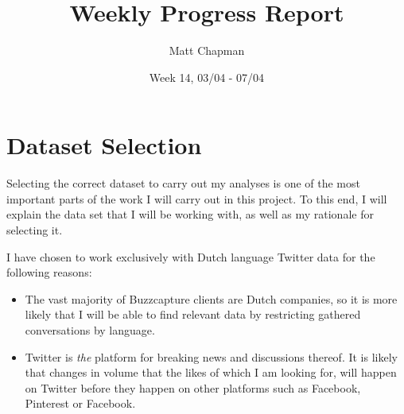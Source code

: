 \documentclass[a4paper]{scrartcl}
\title{Weekly Progress Report}
\date{Week 14, 03/04 - 07/04}
\author{Matt Chapman}
\begin{document}
\maketitle

\section{Dataset Selection}

Selecting the correct dataset to carry out my analyses is one of the most important parts of the work I will carry out in this project. To this end, I will explain the data set that I will be working with, as well as my rationale for selecting it.

I have chosen to work exclusively with Dutch language Twitter data for the following reasons:

\begin{itemize}
	\item The vast majority of Buzzcapture clients are Dutch companies, so it is more likely that I will be able to find relevant data by restricting gathered conversations by language.
	\item Twitter is \emph{the} platform for breaking news and discussions thereof. It is likely that changes in volume that the likes of which I am looking for, will happen on Twitter before they happen on other platforms such as Facebook, Pinterest or Facebook.
\end{itemize}

\newpage
\printbibliography
\end{document}
